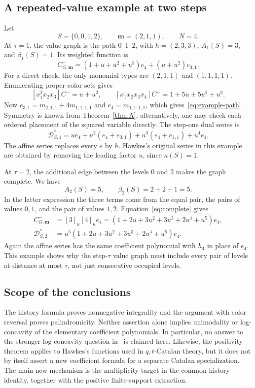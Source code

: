 \documentclass[11pt,reqno]{amsart}
\newcommand{\mm}{\mathbf m}
\newcommand{\DD}{\mathcal D}
\theoremstyle{definition}
\theoremstyle{remark}
\numberwithin{equation}{section}
\begin{document}
\subsection{A repeated-value example at two steps}
Let
\[
 S=\{0,0,1,2\},\qquad \mm=(2,1,1),\qquad N=4.
\]
At $\tau=1$, the value graph is the path $0$--$1$--$2$, with
$h=(2,3,3)$, $A_1(S)=3$, and $\beta_1(S)=1$.  Its weighted function is
\begin{equation}\label{eq:example-path}
 C^-_{G,\mm}
   =(1+u+u^2+u^3)e_4+(u+u^2)e_{3,1}.
\end{equation}
For a direct check, the only monomial types are $(2,1,1)$ and
$(1,1,1,1)$.  Enumerating proper color sets gives
\[
 [x_1^2x_2x_3]C^-=u+u^2,\qquad
 [x_1x_2x_3x_4]C^-=1+5u+5u^2+u^3.
\]
Now $e_{3,1}=m_{2,1,1}+4m_{1,1,1,1}$ and
$e_4=m_{1,1,1,1}$, which gives~\eqref{eq:example-path}.
Symmetry is known from Theorem~\ref{thm:A}; alternatively, one may
check each ordered placement of the squared variable directly.
The step-one dual series is
\begin{equation}\label{eq:example-dual}
 \DD^*_{S,1}
   =u e_4+u^2(e_4+e_{3,1})+u^3(e_4+e_{3,1})+u^4e_4.
\end{equation}
The affine series replaces every $e$ by $h$.  Hawkes's original
series in this example are obtained by removing the leading factor
$u$, since $\kappa(S)=1$.

At $\tau=2$, the additional edge between the levels $0$ and $2$
makes the graph complete.  We have
\[
 A_2(S)=5,\qquad
 \beta_2(S)=2+2+1=5.
\]
In the latter expression the three terms come from the equal pair,
the pairs of values $0,1$, and the pair of values $1,2$.
Equation~\eqref{eq:complete} gives
\begin{align}
 C^-_{G,\mm}
   &=[3]_u[4]_u e_4
     =(1+2u+3u^2+3u^3+2u^4+u^5)e_4,\label{eq:example-complete}\\
 \DD^*_{S,2}
   &=u^5(1+2u+3u^2+3u^3+2u^4+u^5)e_4.\label{eq:example-two}
\end{align}
Again the affine series has the same coefficient polynomial with
$h_4$ in place of $e_4$.  This example shows why the step-$\tau$
value graph must include every pair of levels at distance at most
$\tau$, not just consecutive occupied levels.

\subsection{Scope of the conclusions}
The history formula proves nonnegative integrality and the argument
with color reversal proves palindromicity.  Neither assertion alone
implies unimodality or log-concavity of the elementary coefficient
polynomials.  In particular, no answer to the stronger
log-concavity question in~\cite[Question~4.10]{KiemLee2024} is claimed
here.  Likewise, the positivity theorem applies to Hawkes's functions
used in $q,t$-Catalan theory, but it does not by itself assert a new
coefficient formula for a separate Catalan specialization.  The main
new mechanism is the multiplicity target in the common-history
identity, together with the positive finite-support extraction.
\end{document}
